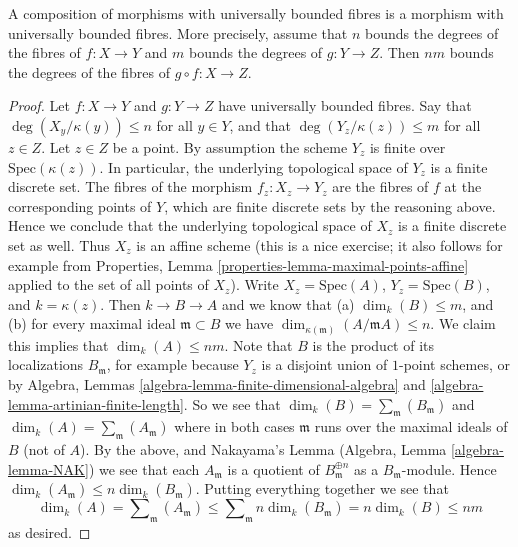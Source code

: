 \begin{lemma}
\label{lemma-composition-universally-bounded}
A composition of morphisms with universally bounded fibres
is a morphism with universally bounded fibres. More precisely,
assume that $n$ bounds the degrees of the fibres of $f : X \to Y$ and
$m$ bounds the degrees of $g : Y \to Z$.
Then $nm$ bounds the degrees of the fibres of $g \circ f : X \to Z$.
\end{lemma}

\begin{proof}
Let $f : X \to Y$ and $g : Y \to Z$ have universally bounded fibres.
Say that $\deg(X_y/\kappa(y)) \leq n$ for all $y \in Y$, and that
$\deg(Y_z/\kappa(z)) \leq m$ for all $z \in Z$.
Let $z \in Z$ be a point. By assumption the scheme
$Y_z$ is finite over $\text{Spec}(\kappa(z))$.
In particular, the underlying topological space of $Y_z$
is a finite discrete set. The fibres of the morphism
$f_z : X_z \to Y_z$ are the fibres of $f$ at the corresponding
points of $Y$, which are finite discrete sets by the reasoning above.
Hence we conclude that the underlying topological space
of $X_z$ is a finite discrete set as well. Thus $X_z$ is an affine
scheme (this is a nice exercise; it also follows for example from
Properties, Lemma \ref{properties-lemma-maximal-points-affine}
applied to the set of all points of $X_z$). Write $X_z = \text{Spec}(A)$,
$Y_z = \text{Spec}(B)$, and $k = \kappa(z)$. Then $k \to B \to A$
and we know that (a) $\dim_k(B) \leq m$, and (b) for every maximal
ideal $\mathfrak m \subset B$ we have
$\dim_{\kappa(\mathfrak m)}(A/\mathfrak mA) \leq n$.
We claim this implies that $\dim_k(A) \leq nm$.
Note that $B$ is the product of its localizations $B_{\mathfrak m}$, for
example because $Y_z$ is a disjoint union of $1$-point schemes, or by
Algebra, Lemmas \ref{algebra-lemma-finite-dimensional-algebra} and
\ref{algebra-lemma-artinian-finite-length}.
So we see that
$\dim_k(B) = \sum_{\mathfrak m}(B_{\mathfrak m})$ and
$\dim_k(A) = \sum_{\mathfrak m}(A_{\mathfrak m})$ where
in both cases $\mathfrak m$ runs over the maximal ideals of
$B$ (not of $A$). By the above, and Nakayama's Lemma
(Algebra, Lemma \ref{algebra-lemma-NAK})
we see that each $A_{\mathfrak m}$ is a quotient of
$B_{\mathfrak m}^{\oplus n}$ as a $B_{\mathfrak m}$-module. Hence
$\dim_k(A_{\mathfrak m}) \leq n \dim_k(B_{\mathfrak m})$. Putting
everything together we see that
$$
\dim_k(A) = \sum\nolimits_{\mathfrak m}(A_{\mathfrak m})
\leq \sum\nolimits_{\mathfrak m} n \dim_k(B_{\mathfrak m})
= n \dim_k(B) \leq nm
$$
as desired.
\end{proof}

